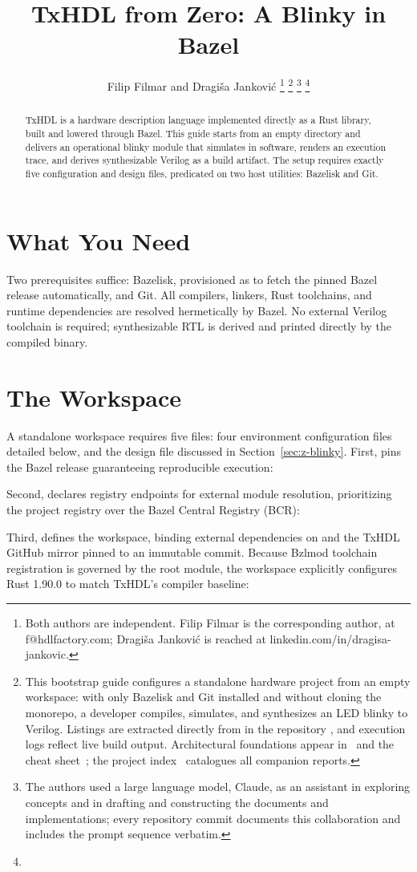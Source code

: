 \documentclass[journal,9pt]{IEEEtran}
\title{TxHDL from Zero: A Blinky in Bazel}
\author{Filip Filmar and Dragiša Janković%
\thanks{Both authors are independent. Filip Filmar is the
corresponding author, at f@hdlfactory.com; Dragiša Janković is
reached at linkedin.com/in/dragisa-jankovic.}%
\thanks{This bootstrap guide configures a standalone hardware project
from an empty workspace: with only Bazelisk and Git installed and without
cloning the monorepo, a developer compiles, simulates, and synthesizes an LED
blinky to Verilog. Listings are extracted directly from \code{tutorial/blinky/}
in the repository \code{HDL/txhdl}, and execution logs reflect live build
output. Architectural foundations appear in~\cite{tutorial} and the cheat
sheet~\cite{cheatsheet}; the project index~\cite{cover} catalogues all companion
reports.}%
\thanks{The authors used a large language model, Claude, as an
assistant in exploring concepts and in drafting and constructing
the documents and implementations; every repository commit documents
this collaboration and includes the prompt sequence verbatim.}%
\thanks{\buildstamp}}
\begin{document}
\maketitle

\begin{abstract}
TxHDL is a hardware description language implemented directly as a Rust
library, built and lowered through Bazel. This guide starts from an empty
directory and delivers an operational blinky module that simulates in software,
renders an execution trace, and derives synthesizable Verilog as a build
artifact. The setup requires exactly five configuration and design files,
predicated on two host utilities: Bazelisk and Git.
\end{abstract}

\section{What You Need}
\label{sec:z-need}

Two prerequisites suffice: Bazelisk, provisioned as  to fetch the
pinned Bazel release automatically, and Git. All compilers, linkers, Rust
toolchains, and runtime dependencies are resolved hermetically by Bazel. No
external Verilog toolchain is required; synthesizable RTL is derived and printed
directly by the compiled binary.

\section{The Workspace}
\label{sec:z-files}

A standalone workspace requires five files: four environment configuration
files detailed below, and the design file discussed in
Section~\ref{sec:z-blinky}. First,  pins the Bazel release
guaranteeing reproducible execution:



Second,  declares registry endpoints for external module
resolution, prioritizing the project registry over the Bazel Central Registry
(BCR):



Third,  defines the workspace, binding external dependencies
on  and the TxHDL GitHub mirror pinned to an immutable commit.
Because Bzlmod toolchain registration is governed by the root module, the
workspace explicitly configures Rust 1.90.0 to match TxHDL's compiler baseline:
\end{document}
